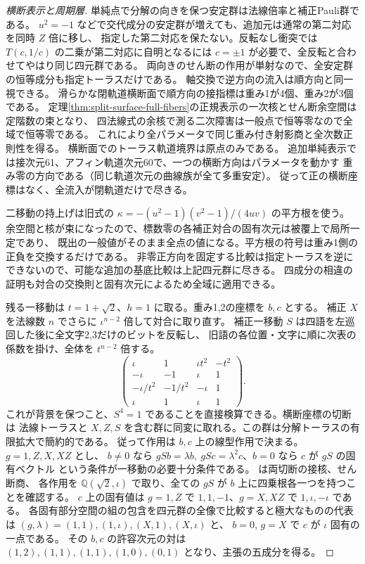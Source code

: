 \begin{proof}[横断表示と周期層]
単純点で分解の向きを保つ安定群は法線倍率と補正Pauli群である。
$u^2=-1$ などで交代成分の安定群が増えても、追加元は通常の第二対応を同時 $Z$ 倍に移し、
指定した第二対応を保たない。反転なし衝突では $T(c,1/c)$ の二乗が第二対応に自明となるには
$c=\pm1$ が必要で、全反転と合わせてやはり同じ四元群である。
両向きのせん断の作用が単射なので、全安定群の恒等成分も指定トーラスだけである。
軸交換で逆方向の流入は順方向と同一視できる。
滑らかな閉軌道横断面で順方向の接指標は重み1が4個、重み2が3個である。
定理\ref{thm:split-surface-full-fibers}の正規表示の一次核とせん断余空間は定階数の束となり、
四法線式の余核で測る二次障害は一般点で恒等零なので全域で恒等零である。
これにより全パラメータで同じ重み付き射影商と全次数正則性を得る。
横断面でのトーラス軌道境界は原点のみである。
追加単純表示では接次元61、アフィン軌道次元60で、一つの横断方向はパラメータを動かす
重み零の方向である（同じ軌道次元の曲線族が全て多重安定）。
従って正の横断座標はなく、全流入が閉軌道だけで尽きる。

二移動の持上げは旧式の $\kappa=-(u^2-1)(v^2-1)/(4uv)$ の平方根を使う。
余空間と核が束になったので、標数零の各補正対合の固有次元は被覆上で局所一定であり、
既出の一般値がそのまま全点の値になる。平方根の符号は重み1側の正負を交換するだけである。
非零正方向を固定する比較は指定トーラスを逆にできないので、可能な追加の基底比較は上記四元群に尽きる。
四成分の相違の証明も対合の交換則と固有次元によるため全域に適用できる。

残る一移動は $t=1+\sqrt2$、$h=1$ に取る。重み1,2の座標を $b,c$ とする。
補正 $X$ を法線数 $n$ でさらに $\iota^{n-2}$ 倍して対合に取り直す。
補正一移動 $S$ は四語を左巡回した後に全文字2,3だけのビットを反転し、
旧語の各位置・文字に順に次表の係数を掛け、全体を $t^{n-2}$ 倍する。
\[
\begin{pmatrix}
 \iota&1&\iota t^2&-t^2\\
 -\iota&-1&\iota&1\\
 -\iota/t^2&-1/t^2&-\iota&1\\
 \iota&1&\iota&1
\end{pmatrix}.
\]
これが背景を保つこと、$S^4=1$ であることを直接検算できる。横断座標の切断は
法線トーラスと $X,Z,S$ を含む群に同変に取れる。この群は分解トーラスの有限拡大で簡約的である。
従って作用は $b,c$ 上の線型作用で決まる。$g=1,Z,X,XZ$ とし、
$b\ne0$ なら $gSb=\lambda b,\ gSc=\lambda^2c$、$b=0$ なら $c$ が $gS$ の固有ベクトル
という条件が一移動の必要十分条件である。
 は両切断の接核、せん断商、
各作用を $\mathbb Q(\sqrt2,\iota)$ で取り、全ての $gS$ が $b$ 上に四乗根各一つを持つことを確認する。
$c$ 上の固有値は $g=1,Z$ で $1,1,-1$、$g=X,XZ$ で $1,\iota,-\iota$ である。
各固有部分空間の組の包含を四元群の全像で比較すると極大なものの代表は
$(g,\lambda)=(1,1),(1,\iota),(X,1),(X,\iota)$ と、
$b=0$, $g=X$ で $c$ が $\iota$ 固有の一点である。
その $b,c$ の許容次元の対は $(1,2),(1,1),(1,1),(1,0),(0,1)$ となり、主張の五成分を得る。
\end{proof}
